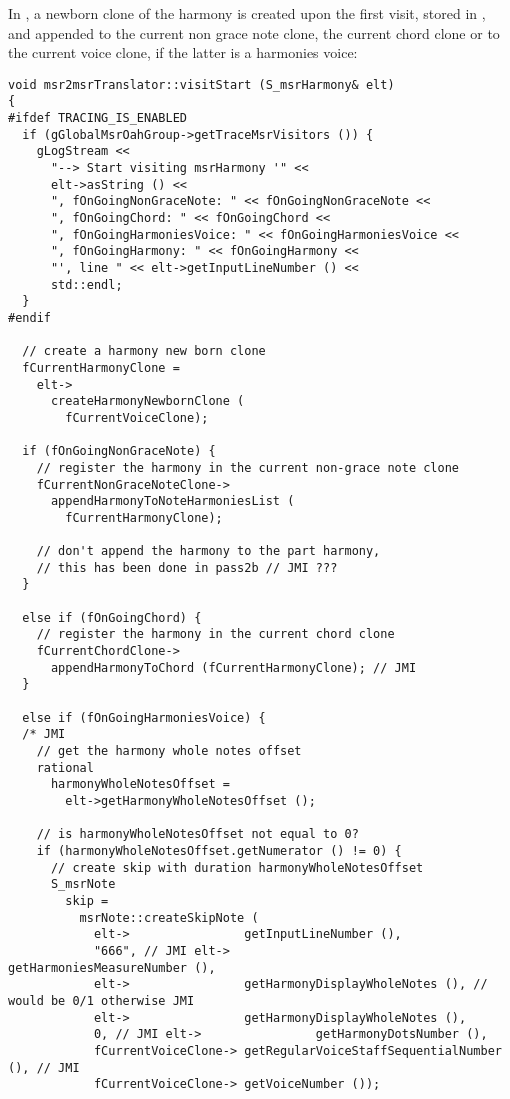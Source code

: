 In , a newborn clone of the harmony is created upon the first visit, stored in , and appended to the current non grace note clone, the current chord clone or to the current voice clone, if the latter is a harmonies voice: %
\begin{lstlisting}[language=CPlusPlus]
void msr2msrTranslator::visitStart (S_msrHarmony& elt)
{
#ifdef TRACING_IS_ENABLED
  if (gGlobalMsrOahGroup->getTraceMsrVisitors ()) {
    gLogStream <<
      "--> Start visiting msrHarmony '" <<
      elt->asString () <<
      ", fOnGoingNonGraceNote: " << fOnGoingNonGraceNote <<
      ", fOnGoingChord: " << fOnGoingChord <<
      ", fOnGoingHarmoniesVoice: " << fOnGoingHarmoniesVoice <<
      ", fOnGoingHarmony: " << fOnGoingHarmony <<
      "', line " << elt->getInputLineNumber () <<
      std::endl;
  }
#endif

  // create a harmony new born clone
  fCurrentHarmonyClone =
    elt->
      createHarmonyNewbornClone (
        fCurrentVoiceClone);

  if (fOnGoingNonGraceNote) {
    // register the harmony in the current non-grace note clone
    fCurrentNonGraceNoteClone->
      appendHarmonyToNoteHarmoniesList (
        fCurrentHarmonyClone);

    // don't append the harmony to the part harmony,
    // this has been done in pass2b // JMI ???
  }

  else if (fOnGoingChord) {
    // register the harmony in the current chord clone
    fCurrentChordClone->
      appendHarmonyToChord (fCurrentHarmonyClone); // JMI
  }

  else if (fOnGoingHarmoniesVoice) {
  /* JMI
    // get the harmony whole notes offset
    rational
      harmonyWholeNotesOffset =
        elt->getHarmonyWholeNotesOffset ();

    // is harmonyWholeNotesOffset not equal to 0?
    if (harmonyWholeNotesOffset.getNumerator () != 0) {
      // create skip with duration harmonyWholeNotesOffset
      S_msrNote
        skip =
          msrNote::createSkipNote (
            elt->                getInputLineNumber (),
            "666", // JMI elt->                getHarmoniesMeasureNumber (),
            elt->                getHarmonyDisplayWholeNotes (), // would be 0/1 otherwise JMI
            elt->                getHarmonyDisplayWholeNotes (),
            0, // JMI elt->                getHarmonyDotsNumber (),
            fCurrentVoiceClone-> getRegularVoiceStaffSequentialNumber (), // JMI
            fCurrentVoiceClone-> getVoiceNumber ());


\end{lstlisting}
